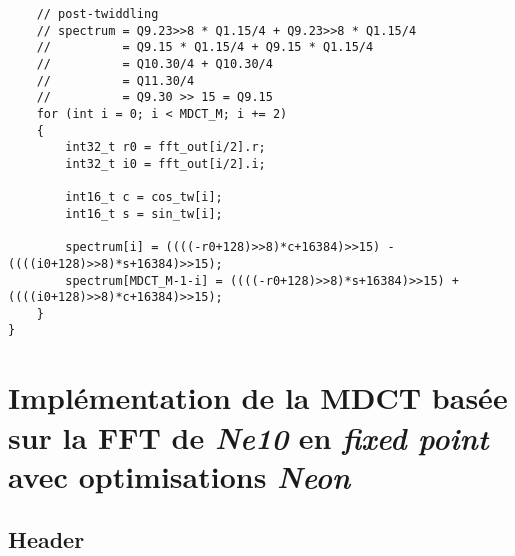 \documentclass{article}
\begin{document}
\begin{lstlisting}
    // post-twiddling
    // spectrum = Q9.23>>8 * Q1.15/4 + Q9.23>>8 * Q1.15/4
    //          = Q9.15 * Q1.15/4 + Q9.15 * Q1.15/4
    //          = Q10.30/4 + Q10.30/4
    //          = Q11.30/4
    //          = Q9.30 >> 15 = Q9.15
    for (int i = 0; i < MDCT_M; i += 2)
    {
        int32_t r0 = fft_out[i/2].r;
        int32_t i0 = fft_out[i/2].i;

        int16_t c = cos_tw[i];
        int16_t s = sin_tw[i];

        spectrum[i] = ((((-r0+128)>>8)*c+16384)>>15) - ((((i0+128)>>8)*s+16384)>>15);
        spectrum[MDCT_M-1-i] = ((((-r0+128)>>8)*s+16384)>>15) + ((((i0+128)>>8)*c+16384)>>15);
    }
}
\end{lstlisting}




\newpage
\section{Implémentation de la MDCT basée sur la FFT de \emph{Ne10} en \emph{fixed point} avec optimisations \emph{Neon}}\label{app:mdct_ne10_i32_neon}
\subsection{Header}\label{app:mdct_ne10_i32_neon_header}
\end{document}
